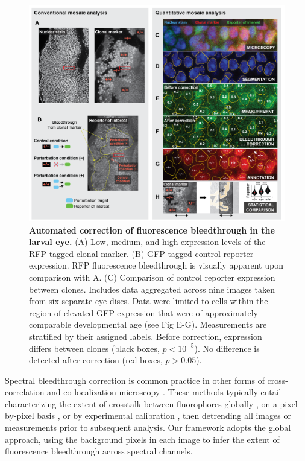 \documentclass[10pt,letterpaper]{article}
\begin{document}
\begin{figure}[t]
\centering
\includegraphics[scale=1.0]{./figure_2}
\caption{\textbf{Automated correction of fluorescence bleedthrough in the larval eye.} (A) Low, medium, and high expression levels of the RFP-tagged clonal marker. (B) GFP-tagged control reporter expression. RFP fluorescence bleedthrough is visually apparent upon comparison with A. (C) Comparison of control reporter expression between clones. Includes data aggregated across nine images taken from six separate eye discs. Data were limited to cells within the region of elevated GFP expression that were of approximately comparable developmental age (see Fig E-G). Measurements are stratified by their assigned labels. Before correction, expression differs between clones (black boxes, $p<10^{-5}$). No difference is detected after correction (red boxes, $p>0.05$).}
\label{fig2}
\end{figure}

Spectral bleedthrough correction is common practice in other forms of cross-correlation and co-localization microscopy \cite{Bacia2012,Zinchuk2007}. These methods typically entail characterizing the extent of crosstalk between fluorophores globally \cite{Arsenovic2017,Kim2013}, on a pixel-by-pixel basis \cite{Elangovan2003}, or by experimental calibration \cite{Bacia2012}, then detrending all images or measurements prior to subsequent analysis. Our framework adopts the global approach, using the background pixels in each image to infer the extent of fluorescence bleedthrough across spectral channels.
\end{document}
